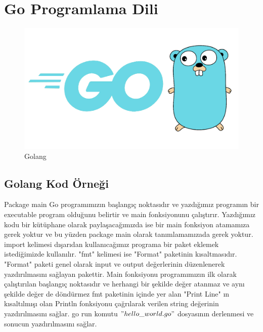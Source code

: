 \chapter{Go Programlama Dili}

\begin{figure}[!htb]
    \centering
    \includegraphics[width=1\linewidth]{00-images/00-golang.png}
    \caption{Golang}
    \label{fig:my_label}
\end{figure}


\section{Golang Kod Örneği}



Package main Go programımızın başlangıç noktasıdır ve yazdığımız programın bir executable program olduğunu belirtir ve main fonksiyonunu çalıştırır.
Yazdığımız kodu bir kütüphane olarak paylaşacağımızda ise bir main fonksiyon atamamıza gerek yoktur ve bu yüzden package main olarak tanımlamamızada gerek yoktur. 
import kelimesi dışarıdan kullanıcağımız programa bir paket eklemek istediğimizde kullanılır.
"fmt" kelimesi ise "Format" paketinin kısaltmasıdır. "Format" paketi genel olarak input ve output değerlerinin düzenlenerek yazdırılmasını sağlayan pakettir. 
Main fonksiyonu programımızın ilk olarak çalıştırılan başlangıç noktasıdır ve herhangi bir şekilde değer atanmaz ve aynı şekilde değer de döndürmez 
fmt paketinin içinde yer alan "Print Line" ın kısaltılmışı olan Println  fonksiyonu çağrılarak verilen string değerinin yazdırılmasını sağlar.
go run komutu $"hello\_world.go"$ dosyasının derlenmesi ve sonucun yazdırılmasını sağlar.

